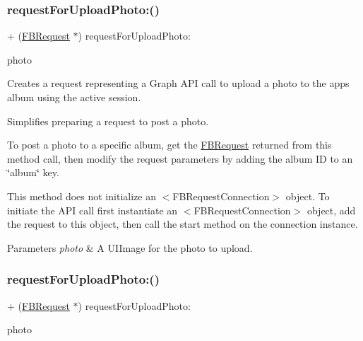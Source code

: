 \subsubsection{\texorpdfstring{request\+For\+Upload\+Photo\+:()}{requestForUploadPhoto:()}\hspace{0.1cm}{\footnotesize\ttfamily [4/5]}}
{\footnotesize\ttfamily + (\hyperlink{interfaceFBRequest}{F\+B\+Request} $\ast$) request\+For\+Upload\+Photo\+: \begin{DoxyParamCaption}\item[{(U\+I\+Image $\ast$)}]{photo }\end{DoxyParamCaption}}

Creates a request representing a Graph A\+PI call to upload a photo to the app\textquotesingle{}s album using the active session.

Simplifies preparing a request to post a photo.

To post a photo to a specific album, get the {\ttfamily \hyperlink{interfaceFBRequest}{F\+B\+Request}} returned from this method call, then modify the request parameters by adding the album ID to an \char`\"{}album\char`\"{} key.

This method does not initialize an $<$\+F\+B\+Request\+Connection$>$ object. To initiate the A\+PI call first instantiate an $<$\+F\+B\+Request\+Connection$>$ object, add the request to this object, then call the {\ttfamily start} method on the connection instance.


\begin{DoxyParams}{Parameters}
{\em photo} & A {\ttfamily U\+I\+Image} for the photo to upload. \\
\hline
\end{DoxyParams}
\mbox{\label{interfaceFBRequest_a871fdb57a3c9907a5d2b788ca442c586}} 
\subsubsection{\texorpdfstring{request\+For\+Upload\+Photo\+:()}{requestForUploadPhoto:()}\hspace{0.1cm}{\footnotesize\ttfamily [5/5]}}
{\footnotesize\ttfamily + (\hyperlink{interfaceFBRequest}{F\+B\+Request} $\ast$) request\+For\+Upload\+Photo\+: \begin{DoxyParamCaption}\item[{(U\+I\+Image $\ast$)}]{photo }\end{DoxyParamCaption}}

